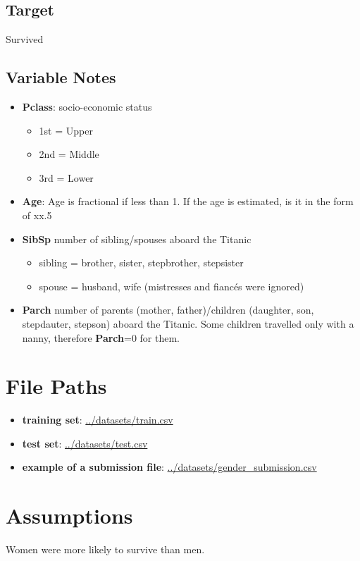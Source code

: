 \subsection{Target}
Survived


\subsection{Variable Notes}
\begin{itemize}
	\item \textbf{Pclass}: socio-economic status
		\begin{itemize}
		    \item 1st = Upper
		    \item 2nd = Middle
		    \item 3rd = Lower
		\end{itemize}
	\item \textbf{Age}: Age is fractional if less than 1. If the age is 
	estimated, is it in the form of xx.5
	\item \textbf{SibSp} number of sibling/spouses aboard the Titanic
		\begin{itemize}
		    \item sibling = brother, sister, stepbrother, stepsister
		    \item spouse = husband, wife (mistresses and fiancés were 
		    ignored)
		\end{itemize}
	\item \textbf{Parch} number of parents (mother, father)/children 
	(daughter, son, stepdauter, stepson) aboard the Titanic. Some 
	children travelled only with a nanny, therefore \textbf{Parch}=0 for 
	them.
\end{itemize}


\section{File Paths}
\begin{itemize}
	\item \textbf{training set}: \url{../datasets/train.csv}
	\item \textbf{test set}: \url{../datasets/test.csv}
	\item \textbf{example of a submission file}:
	\url{../datasets/gender_submission.csv}
\end{itemize}


\section{Assumptions}
Women were more likely to survive than men.